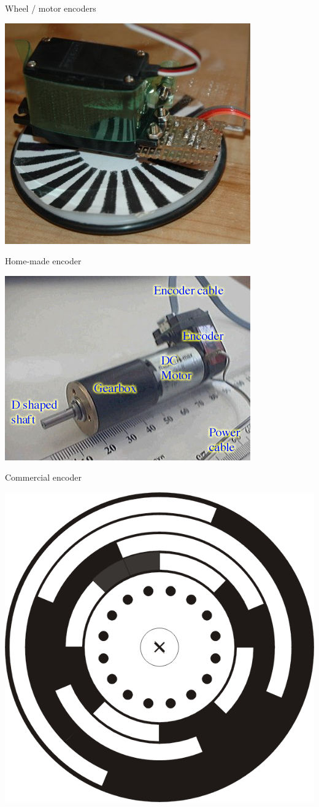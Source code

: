 \documentclass[compress]{beamer}
\begin{document}
\begin{frame}{Wheel / motor encoders}

    \centering
    \begin{multicols}{2}
        \includegraphics[width=0.6\linewidth]{encoders3}

        Home-made encoder

        \includegraphics[width=0.6\linewidth]{encoders5}

        Commercial encoder

        \begin{center}
            \includegraphics[width=0.9\linewidth]{encoders4}
        \end{center}


\end{multicols}
\end{frame}
\end{document}
